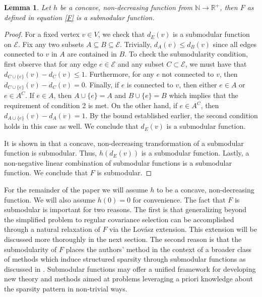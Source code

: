\documentclass{uwstat572}
\newtheorem{lemma}[theorem]{Lemma}
\theoremstyle{remark}
\theoremstyle{definition}
\begin{document}
\begin{lemma}
Let $h$ be a concave, non-decreasing function from $\mathbb{N} \to \mathbb{R}^+$, then $F$ as defined in equation \eqref{F} is a submodular function.
\end{lemma}
\begin{proof}
For a fixed vertex $v \in V$, we check that $d_E(v)$ is a submodular function on $\mathcal{E}$.  Fix any two subsets $A \subseteq B \subseteq \mathcal{E}$.  Trivially, $d_A(v) \leq d_B(v)$ since all edges connected to $v$ in $A$ are contained in $B$.  To check the submodularity condition, first observe that for any edge $e \in \mathcal{E}$ and any subset $C \subset \mathcal{E}$, we must have that $d_{C \cup \{e\}}(v) - d_{C}(v) \leq 1$.  Furthermore, for any $e$ not connected to $v$, then $d_{C \cup \{e\}}(v) - d_{C}(v) = 0$.  Finally, if $e$ is connected to $v$, then either $e \in A$ or $e \in A^C$.  If $e \in A$, then $A \cup \{e\} = A$ and $B \cup \{e\} = B$ which implies that the requirement of condition 2 is met.  On the other hand, if $e \in A^C$, then $d_{A \cup \{e\}} (v) - d_A(v) = 1$.  By the bound established earlier, the second condition holds in this case as well.  We conclude that
$d_E(v)$ is a submodular function.

It is shown in \citep{fujishige2005submodular} that a concave, non-decreasing transformation of a submodular function is submodular.  Thus, $h(d_E(v))$ is a submodular function.  Lastly, a non-negative linear combination of submodular functions is a submodular function.  We conclude that $F$ is submodular.
\end{proof}

For the remainder of the paper we will assume $h$ to be a concave, non-decreasing function.  We will also assume $h(0) = 0$ for convenience.  The fact that $F$ is submodular is important for two reasons.  The first is that generalizing beyond the simplified problem to regular covariance selection can be accomplished through a natural relaxation of $F$ via the Lov{\'a}sz extension.  This extension will be discussed more thoroughly in the next section.  The second reason is that the submodularity of $F$ places the authors' method in the context of a broader class of methods which induce structured sparsity through submodular functions as discussed in \citep{bach2010}. Submodular functions may offer a unified framework for developing new theory and methods aimed at problems leveraging a priori knowledge about the sparsity pattern in non-trivial ways.
\end{document}
